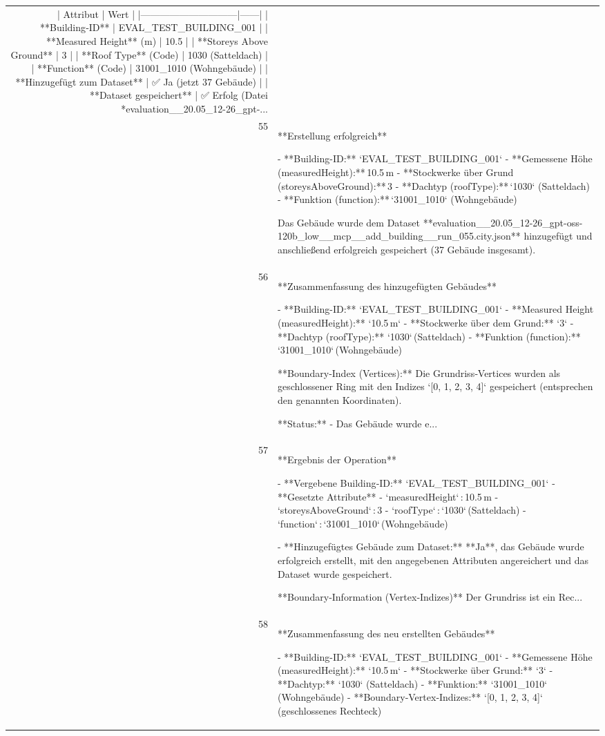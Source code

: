 \documentclass[a4paper,11pt]{article}
\begin{document}
\begin{table}[ht]
\begin{tabular}{r p{12cm}}
| Attribut                      | Wert |
|------------------------------|------|
| **Building‑ID**               | EVAL\_TEST\_BUILDING\_001 |
| **Measured Height** (m)       | 10.5 |
| **Storeys Above Ground**      | 3 |
| **Roof Type** (Code)          | 1030 (Satteldach) |
| **Function** (Code)           | 31001\_1010 (Wohngebäude) |
| **Hinzugefügt zum Dataset**   | ✅ Ja (jetzt 37 Gebäude) |
| **Dataset gespeichert**       | ✅ Erfolg (Datei *evaluation\_\_20.05\_12-26\_gpt‑... \\
55 & **Erstellung erfolgreich**

- **Building-ID:** `EVAL\_TEST\_BUILDING\_001`  
- **Gemessene Höhe (measuredHeight):** 10.5 m  
- **Stockwerke über Grund (storeysAboveGround):** 3  
- **Dachtyp (roofType):** `1030` (Satteldach)  
- **Funktion (function):** `31001\_1010` (Wohngebäude)  

Das Gebäude wurde dem Dataset **evaluation\_\_20.05\_12-26\_gpt-oss-120b\_low\_\_mcp\_\_add\_building\_\_run\_055.city.json** hinzugefügt und anschließend erfolgreich gespeichert (37 Gebäude insgesamt). \\
56 & **Zusammenfassung des hinzugefügten Gebäudes**

- **Building-ID:** `EVAL\_TEST\_BUILDING\_001`  
- **Measured Height (measuredHeight):** `10.5 m`  
- **Stockwerke über dem Grund:** `3`  
- **Dachtyp (roofType):** `1030` (Satteldach)  
- **Funktion (function):** `31001\_1010` (Wohngebäude)  

**Boundary‑Index (Vertices):**  
Die Grundriss‑Vertices wurden als geschlossener Ring mit den Indizes  
`[0, 1, 2, 3, 4]` gespeichert (entsprechen den genannten Koordinaten).

**Status:**  
- Das Gebäude wurde e... \\
57 & **Ergebnis der Operation**

- **Vergebene Building‑ID:** `EVAL\_TEST\_BUILDING\_001`  
- **Gesetzte Attribute**  
  - `measuredHeight` : 10.5 m  
  - `storeysAboveGround` : 3  
  - `roofType` : `1030` (Satteldach)  
  - `function` : `31001\_1010` (Wohngebäude)  

- **Hinzugefügtes Gebäude zum Dataset:** **Ja**, das Gebäude wurde erfolgreich erstellt, mit den angegebenen Attributen angereichert und das Dataset wurde gespeichert.  

**Boundary‑Information (Vertex‑Indizes)**  
Der Grundriss ist ein Rec... \\
58 & **Zusammenfassung des neu erstellten Gebäudes**

- **Building-ID:** `EVAL\_TEST\_BUILDING\_001`  
- **Gemessene Höhe (measuredHeight):** `10.5 m`  
- **Stockwerke über Grund:** `3`  
- **Dachtyp:** `1030` (Satteldach)  
- **Funktion:** `31001\_1010` (Wohngebäude)  
- **Boundary‑Vertex‑Indizes:** `[0, 1, 2, 3, 4]` (geschlossenes Rechteck)


\end{tabular}
\end{table}
\end{document}
